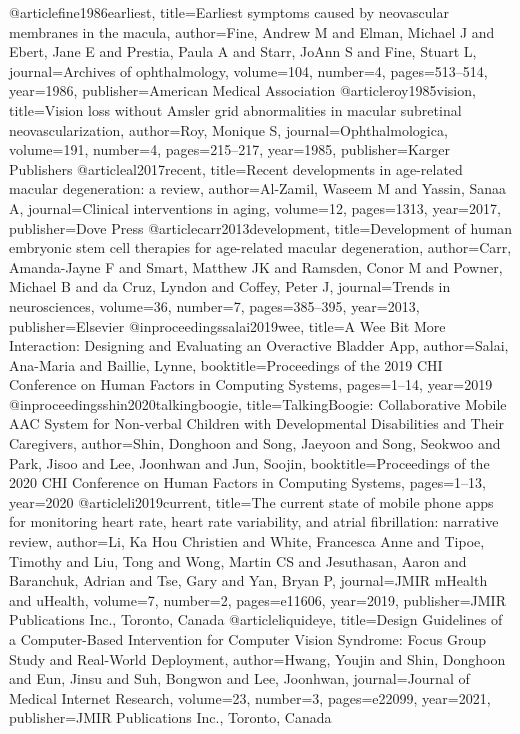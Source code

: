 @article{fine1986earliest,
  title={Earliest symptoms caused by neovascular membranes in the macula},
  author={Fine, Andrew M and Elman, Michael J and Ebert, Jane E and Prestia, Paula A and Starr, JoAnn S and Fine, Stuart L},
  journal={Archives of ophthalmology},
  volume={104},
  number={4},
  pages={513--514},
  year={1986},
  publisher={American Medical Association}
}
@article{roy1985vision,
  title={Vision loss without Amsler grid abnormalities in macular subretinal neovascularization},
  author={Roy, Monique S},
  journal={Ophthalmologica},
  volume={191},
  number={4},
  pages={215--217},
  year={1985},
  publisher={Karger Publishers}
}
@article{al2017recent,
  title={Recent developments in age-related macular degeneration: a review},
  author={Al-Zamil, Waseem M and Yassin, Sanaa A},
  journal={Clinical interventions in aging},
  volume={12},
  pages={1313},
  year={2017},
  publisher={Dove Press}
}
@article{carr2013development,
  title={Development of human embryonic stem cell therapies for age-related macular degeneration},
  author={Carr, Amanda-Jayne F and Smart, Matthew JK and Ramsden, Conor M and Powner, Michael B and da Cruz, Lyndon and Coffey, Peter J},
  journal={Trends in neurosciences},
  volume={36},
  number={7},
  pages={385--395},
  year={2013},
  publisher={Elsevier}
}
@inproceedings{salai2019wee,
  title={A Wee Bit More Interaction: Designing and Evaluating an Overactive Bladder App},
  author={Salai, Ana-Maria and Baillie, Lynne},
  booktitle={Proceedings of the 2019 CHI Conference on Human Factors in Computing Systems},
  pages={1--14},
  year={2019}
}
@inproceedings{shin2020talkingboogie,
  title={TalkingBoogie: Collaborative Mobile AAC System for Non-verbal Children with Developmental Disabilities and Their Caregivers},
  author={Shin, Donghoon and Song, Jaeyoon and Song, Seokwoo and Park, Jisoo and Lee, Joonhwan and Jun, Soojin},
  booktitle={Proceedings of the 2020 CHI Conference on Human Factors in Computing Systems},
  pages={1--13},
  year={2020}
}
@article{li2019current,
  title={The current state of mobile phone apps for monitoring heart rate, heart rate variability, and atrial fibrillation: narrative review},
  author={Li, Ka Hou Christien and White, Francesca Anne and Tipoe, Timothy and Liu, Tong and Wong, Martin CS and Jesuthasan, Aaron and Baranchuk, Adrian and Tse, Gary and Yan, Bryan P},
  journal={JMIR mHealth and uHealth},
  volume={7},
  number={2},
  pages={e11606},
  year={2019},
  publisher={JMIR Publications Inc., Toronto, Canada}
}
@article{liquideye,
  title={Design Guidelines of a Computer-Based Intervention for Computer Vision Syndrome: Focus Group Study and Real-World Deployment},
  author={Hwang, Youjin and Shin, Donghoon and Eun, Jinsu and Suh, Bongwon and Lee, Joonhwan},
  journal={Journal of Medical Internet Research},
  volume={23},
  number={3},
  pages={e22099},
  year={2021},
  publisher={JMIR Publications Inc., Toronto, Canada}
}
